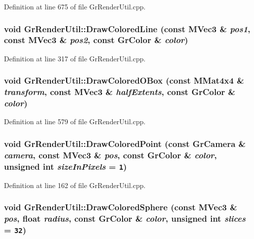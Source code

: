 Definition at line 675 of file GrRenderUtil.cpp.\hypertarget{class_gr_render_util_43fcf0adfd8aff3ede03fb334970993b}{
\subsubsection[{DrawColoredLine}]{\setlength{\rightskip}{0pt plus 5cm}void GrRenderUtil::DrawColoredLine (const {\bf MVec3} \& {\em pos1}, \/  const {\bf MVec3} \& {\em pos2}, \/  const {\bf GrColor} \& {\em color})}}
\label{class_gr_render_util_43fcf0adfd8aff3ede03fb334970993b}




Definition at line 317 of file GrRenderUtil.cpp.\hypertarget{class_gr_render_util_5cd3a6ac45a9d948b093495641d907dd}{
\subsubsection[{DrawColoredOBox}]{\setlength{\rightskip}{0pt plus 5cm}void GrRenderUtil::DrawColoredOBox (const {\bf MMat4x4} \& {\em transform}, \/  const {\bf MVec3} \& {\em halfExtents}, \/  const {\bf GrColor} \& {\em color})}}
\label{class_gr_render_util_5cd3a6ac45a9d948b093495641d907dd}




Definition at line 579 of file GrRenderUtil.cpp.\hypertarget{class_gr_render_util_77102bada1fcd509f9b18d5ff274807e}{
\subsubsection[{DrawColoredPoint}]{\setlength{\rightskip}{0pt plus 5cm}void GrRenderUtil::DrawColoredPoint (const {\bf GrCamera} \& {\em camera}, \/  const {\bf MVec3} \& {\em pos}, \/  const {\bf GrColor} \& {\em color}, \/  unsigned int {\em sizeInPixels} = {\tt 1})}}
\label{class_gr_render_util_77102bada1fcd509f9b18d5ff274807e}




Definition at line 162 of file GrRenderUtil.cpp.\hypertarget{class_gr_render_util_d10d280236c7ab0ffa19c61a47a1afce}{
\subsubsection[{DrawColoredSphere}]{\setlength{\rightskip}{0pt plus 5cm}void GrRenderUtil::DrawColoredSphere (const {\bf MVec3} \& {\em pos}, \/  float {\em radius}, \/  const {\bf GrColor} \& {\em color}, \/  unsigned int {\em slices} = {\tt 32})}}
\label{class_gr_render_util_d10d280236c7ab0ffa19c61a47a1afce}




